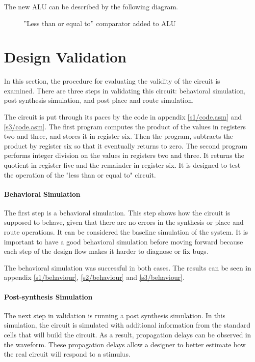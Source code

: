 \documentclass[11pt,letterpaper,final]{article}
\begin{document}
The new ALU can be described by the following diagram.

\begin{figure}[H]
  \centering
  \caption{''Less than or equal to'' comparator added to ALU}
  \label{fig:alu2}
\end{figure}

\section{ Design Validation }
\paragraph{}
In this section, the procedure for evaluating the validity of the circuit is examined.  There are three steps in validating this circuit: behavioral simulation, post synthesis simulation, and post place and route simulation.

The circuit is put through its paces by the code in appendix \ref{s1/code.asm} and \ref{s3/code.asm}.  The first program computes the product of the values in registers two and three, and stores it in register six.  Then the program, subtracts the product by register six so that it eventually returns to zero.  The second program performs integer division on the values in registers two and three. It returns the quotient in register five and the remainder in register six.  It is designed to test the operation of the "less than or equal to" circuit.  

\paragraph{ Behavioral Simulation }
The first step is a behavioral simulation.  This step shows how the circuit is supposed to behave, given that there are no errors in the synthesis or place and route operations.  It can be considered the baseline simulation of the system.  It is important to have a good behavioral simulation before moving forward because each step of the design flow makes it harder to diagnose or fix bugs.

The behavioral simulation was successful in both cases.  The results can be seen in appendix \ref{s1/behaviour}, \ref{s2/behaviour} and \ref{s3/behaviour}.

\paragraph{ Post-synthesis Simulation }
The next step in validation is running a post synthesis simulation.  In this simulation, the circuit is simulated with additional information from the standard cells that will build the circuit.  As a result, propagation delays can be observed in the waveform.  These propagation delays allow a designer to better estimate how the real circuit will respond to a stimulus.  
\end{document}
